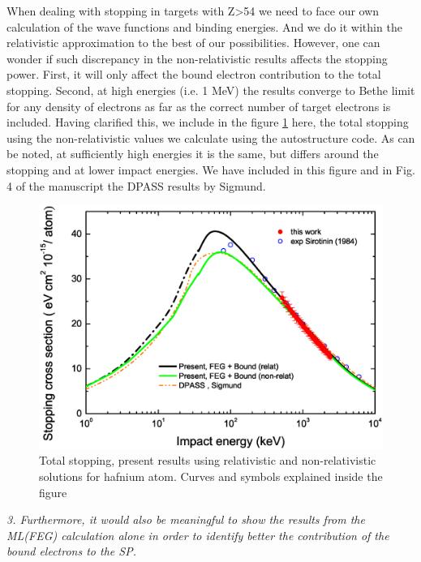 \documentclass[a4paper,10pt]{article}
\begin{document}
{\color{red} When dealing with stopping in targets with Z>54 we need to face our own calculation of the wave functions and binding energies. And we do it within the relativistic approximation to the best of our possibilities. However, one can wonder if such discrepancy in the non-relativistic results affects the stopping power. First, it will only affect the bound electron contribution to the total stopping. Second, at high energies (i.e. 1 MeV) the results converge to Bethe limit for any density of electrons as far as the correct number of target electrons is included. Having clarified this, we include in the figure \ref{NR} here, the total stopping using the non-relativistic values we calculate using the autostructure code. As can be noted, at sufficiently high energies it is the same, but differs around the stopping and at lower impact energies. We have included in this figure and in Fig. 4 of the manuscript the DPASS results by Sigmund.}


\begin{figure}[!t]
\centering
\includegraphics[width=12.cm]{Fig05.eps}
\caption{Total stopping, present results using relativistic and non-relativistic solutions for hafnium atom. Curves and symbols explained inside the figure}
\label{NR}
\end{figure}

\vspace{0.25cm}
\textsl{
3. Furthermore, it would also be meaningful to show the results from
the ML(FEG) calculation alone in order to identify better the
contribution of the bound electrons to the SP.}
\end{document}
